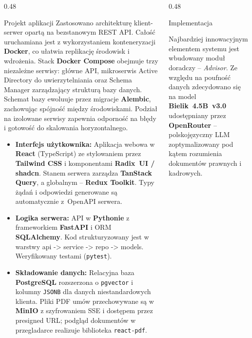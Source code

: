 \documentclass[final]{beamer} %
\begin{document}
\begin{frame}{}
\begin{columns}[T]
\begin{column}[T]{0.48\textwidth}
\begin{block}{Projekt aplikacji}
Zastosowano architekturę klient-serwer opartą na bezstanowym REST API. Całość uruchamiana jest z wykorzystaniem konteneryzacji \textbf{Docker}, co ułatwia replikację środowisk i wdrożenia. Stack \textbf{Docker Compose} obejmuje trzy niezależne serwisy: główne API, mikroserwis Active Directory do uwierzytelniania oraz Schema Manager zarządzający strukturą bazy danych. Schemat bazy ewoluuje przez migracje \textbf{Alembic}, zachowując spójność między środowiskami. Podział na izolowane serwisy zapewnia odporność na błędy i gotowość do skalowania horyzontalnego.

\begin{itemize}
\item \textbf{Interfejs użytkownika:} Aplikacja webowa w \textbf{React} (TypeScript) ze stylowaniem przez \textbf{Tailwind CSS} i komponentami \textbf{Radix~UI / shadcn}. Stanem serwera zarządza \textbf{TanStack Query}, a globalnym -- \textbf{Redux Toolkit}. Typy żądań i odpowiedzi generowane są automatycznie z~OpenAPI serwera.
\item \textbf{Logika serwera:} API w \textbf{Pythonie} z frameworkiem \textbf{FastAPI} i ORM \textbf{SQLAlchemy}. Kod strukturyzowany jest w warstwy api -> service -> repo -> models. Weryfikowany testami (\texttt{pytest}).
\item \textbf{Składowanie danych:} Relacyjna baza \textbf{PostgreSQL} rozszerzona o \texttt{pgvector} i kolumny \texttt{JSONB} dla danych niestandardowych klienta. Pliki PDF umów przechowywane są w \textbf{MinIO} z szyfrowaniem SSE i dostępem przez presigned URL; podgląd dokumentów w przegladarce realizuje biblioteka \texttt{react-pdf}.
\end{itemize}

\end{block}

\end{column}

\begin{column}[T]{0.48\textwidth}

\begin{block}{Implementacja}

Najbardziej innowacyjnym elementem systemu jest wbudowany moduł doradczy -- \textit{Advisor}. Ze względu na poufność danych zdecydowano się na model \textbf{Bielik~4.5B~v3.0} udostępniany przez \textbf{OpenRouter} -- polskojęzyczny LLM zoptymalizowany pod kątem rozumienia dokumentów prawnych i kadrowych.


\end{block}
\end{column}
\end{columns}
\end{frame}
\end{document}
